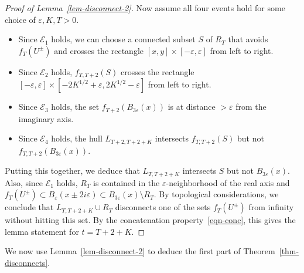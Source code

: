 \documentclass[11pt]{article}
\theoremstyle{plain}
\theoremstyle{definition}
\numberwithin{equation}{section}
\newcommand{\ep}{\varepsilon}
\newcommand{\mcl}{\mathcal}
\begin{document}
\begin{proof}[Proof of Lemma~\ref{lem-disconnect-2}]
Now assume all four events hold for some choice of $\ep,K,T>0$.
\begin{itemize}
\item
Since $\mcl E_1$ holds, we can choose a connected subset $S$ of $R_T$ that avoids $f_T(U^\pm)$ and crosses the rectangle $[x,y] \times [-\ep,\ep]$ from left to right.
\item
Since $\mcl E_2$ holds, $f_{T,T+2}(S)$ crosses the rectangle $[-\ep,\ep] \times [-2K^{1/2}+\ep,2 K^{1/2}-\ep]$ from left to right.
\item
Since $\mcl E_3$ holds, the set $f_{T+2}(B_{3\ep}(x))$ is at distance $> \ep$ from the imaginary axis.
\item
Since $\mcl E_4$ holds, the hull $L_{T+2,T+2+K}$ intersects $f_{T,T+2}(S)$ but not  $f_{T,T+2}(B_{3\ep}(x))$.
\end{itemize}
Putting this together, we deduce that $L_{T,T+2+K}$ intersects $S$ but not $B_{3\ep}(x)$. Also, since $\mcl E_1$ holds, $R_T$ is contained in the $\ep$-neighborhood of the real axis and $f_T(U^\pm) \subset B_\ep(x\pm 2 i\ep) \subset B_{3\ep}(x) \setminus R_T$.  By topological considerations, we conclude that $L_{T,T+2+K} \cup R_T$ disconnects one of the sets $f_T(U^\pm)$ from infinity without hitting this set. By the concatenation property~\eqref{eqn-conc}, this gives the lemma statement for $t = T+2+K$. 
\end{proof}

We now use Lemma~\ref{lem-disconnect-2} to deduce the first part of Theorem~\ref{thm-disconnects}.
\end{document}
